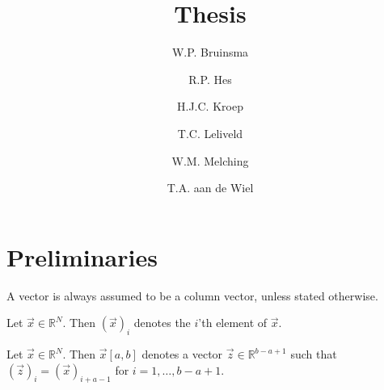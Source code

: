 \documentclass[a4paper, openany, oneside]{memoir}
\title{Thesis}
\author{W.P. Bruinsma \and R.P. Hes \and H.J.C. Kroep \and T.C. Leliveld \and W.M. Melching \and T.A. aan de Wiel}
\begin{document}
\frontmatter

\begin{titlingpage}
  \pagestyle{empty}
  \maketitle
\end{titlingpage}

\tableofcontents

\mainmatter
\chapter{Preliminaries}
A vector is always assumed to be a column vector, unless stated otherwise.

\begin{definition}
    Let $\vec{x} \in \mathbb{R}^N$. Then $(\vec{x})_i$ denotes the $i$'th element of $\vec{x}$.
\end{definition}

\begin{definition}[Subvector]
    Let $\vec{x} \in \mathbb{R}^N$. Then $\vec{x}[a,b]$ denotes a vector $\vec{z} \in \mathbb{R}^{b-a+1}$ such that $(\vec{z})_i = (\vec{x})_{i+a-1}$ for $i = 1,\ldots,b-a+1$.
\end{definition}
\end{document}
